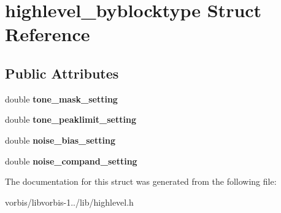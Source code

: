 \hypertarget{structhighlevel__byblocktype}{\section{highlevel\+\_\+byblocktype Struct Reference}
\label{structhighlevel__byblocktype}
}
\subsection*{Public Attributes}
\begin{DoxyCompactItemize}
\item 
\hypertarget{structhighlevel__byblocktype_a4ddd74f9ea85b93e0f8a81da2321dbdd}{double {\bfseries tone\+\_\+mask\+\_\+setting}}\label{structhighlevel__byblocktype_a4ddd74f9ea85b93e0f8a81da2321dbdd}

\item 
\hypertarget{structhighlevel__byblocktype_af7bf4884a347918e37addd21418be5f6}{double {\bfseries tone\+\_\+peaklimit\+\_\+setting}}\label{structhighlevel__byblocktype_af7bf4884a347918e37addd21418be5f6}

\item 
\hypertarget{structhighlevel__byblocktype_ac714cd2ec5928ac5f90de7ce61b21891}{double {\bfseries noise\+\_\+bias\+\_\+setting}}\label{structhighlevel__byblocktype_ac714cd2ec5928ac5f90de7ce61b21891}

\item 
\hypertarget{structhighlevel__byblocktype_a30f1f5f31f0948659f7739541c68273b}{double {\bfseries noise\+\_\+compand\+\_\+setting}}\label{structhighlevel__byblocktype_a30f1f5f31f0948659f7739541c68273b}

\end{DoxyCompactItemize}


The documentation for this struct was generated from the following file\+:\begin{DoxyCompactItemize}
\item 
vorbis/libvorbis-\/1../lib/highlevel.\+h\end{DoxyCompactItemize}
